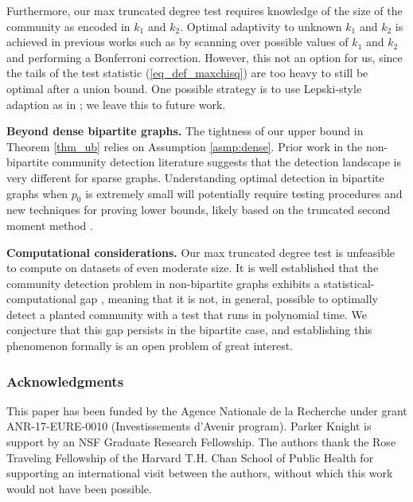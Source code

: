 \documentclass{article}
\begin{document}
Furthermore, our max truncated degree test requires knowledge of the size of the community as encoded in $k_1$ and $k_2$. Optimal adaptivity to unknown $k_1$ and $k_2$ is achieved in previous works such as \cite{butucea2013detection, arias2014community} by scanning over possible values of $k_1$ and $k_2$ and performing a Bonferroni correction. However, this not an option for us, since the tails of the test statistic (\ref{eq_def_maxchisq}) are too heavy to still be optimal after a union bound. One possible strategy is to use Lepski-style adaption as in \cite{kotekal2023sparsity}; we leave this to future work. 

\bigskip 

\noindent \textbf{Beyond dense bipartite graphs.} The tightness of our upper bound in Theorem \ref{thm_ub} relies on Assumption \ref{asmp:dense}. Prior work in the non-bipartite community detection literature \cite{verzelen2015community} suggests that the detection landscape is very different for sparse graphs. Understanding optimal detection in bipartite graphs when $p_0$ is extremely small will potentially require testing procedures and new techniques for proving lower bounds, likely based on the truncated second moment method \cite{ingster2012nonparametric, butucea2013detection, arias2014community, verzelen2015community}.

\bigskip 

\noindent \textbf{Computational considerations.} Our  max truncated degree test is unfeasible to compute on datasets of even moderate size. It is well established that the community detection problem in non-bipartite graphs exhibits a statistical-computational gap \cite{ma2015computational, arias2014community, hajek2015computational,brennan2018reducibility, dadon2024detection, rotenberg2024planted, elimelech2025detecting}, meaning that it is not, in general, possible to optimally detect a planted community with a test that runs in polynomial time. We conjecture that this gap persists in the bipartite case, and establishing this phenomenon formally is an open problem of great interest.


\subsubsection*{Acknowledgments}
This paper has been funded by the Agence Nationale de la Recherche under grant ANR-17-EURE-0010 (Investissements d'Avenir program). Parker Knight is support by an NSF Graduate Research Fellowship. The authors thank the Rose Traveling Fellowship of the Harvard T.H. Chan School of Public Health for supporting an international visit between the authors, without which this work would not have been possible.
\end{document}
